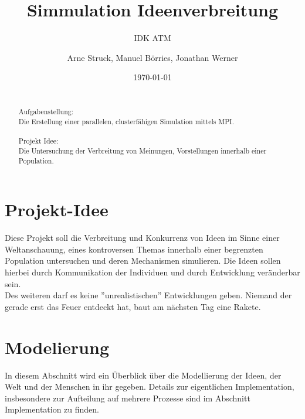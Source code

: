 \title{Simmulation Ideenverbreitung}
\subtitle{IDK ATM}

\author{Arne Struck, Manuel Börries, Jonathan Werner}

  
\date{\today}

\maketitle


\begin{abstract}
\quad \\
Aufgabenstellung: \\
Die Erstellung einer parallelen, clusterfähigen Simulation mittels MPI. \\ \\
Projekt Idee: \\
Die Untersuchung der Verbreitung von Meinungen, Vorstellungen innerhalb einer Population.
\end{abstract}

\tableofcontents
\newpage
\section{Projekt-Idee}
Diese Projekt soll die Verbreitung und Konkurrenz von Ideen im Sinne einer Weltanschauung, eines kontroversen Themas innerhalb einer begrenzten Population untersuchen und deren Mechanismen simulieren. Die Ideen sollen hierbei durch Kommunikation der Individuen und durch Entwicklung veränderbar sein. \\
Des weiteren darf es keine ''unrealistischen'' Entwicklungen geben. Niemand der gerade erst das Feuer entdeckt hat, baut am nächsten Tag eine Rakete.

\section{Modelierung} %
In diesem Abschnitt wird ein Überblick über die Modellierung der Ideen, der Welt und der Menschen in ihr gegeben. Details zur eigentlichen Implementation, insbesondere zur Aufteilung auf mehrere Prozesse sind im Abschnitt Implementation zu finden.
